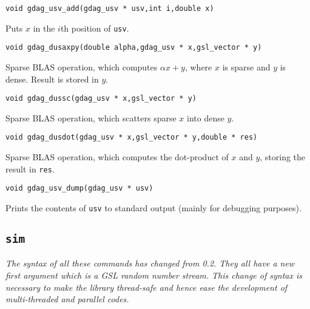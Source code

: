 \documentclass[12pt,a4paper]{article}
\newcommand{\gds}{\texttt{GDAGsim}}
\begin{document}
\begin{verbatim}
void gdag_usv_add(gdag_usv * usv,int i,double x)
\end{verbatim}
Puts $x$ in the $i$th position of \verb$usv$.

\begin{verbatim}
void gdag_dusaxpy(double alpha,gdag_usv * x,gsl_vector * y)
\end{verbatim}
Sparse BLAS operation, which computes $\alpha x + y$, where $x$ is
sparse and $y$ is dense. Result is stored in $y$.


\begin{verbatim}
void gdag_dussc(gdag_usv * x,gsl_vector * y)
\end{verbatim}
Sparse BLAS operation, which scatters sparse $x$ into dense $y$.

\begin{verbatim}
void gdag_dusdot(gdag_usv * x,gsl_vector * y,double * res)
\end{verbatim}
Sparse BLAS operation, which computes the dot-product of $x$ and $y$,
storing the result in \verb$res$.

\begin{verbatim}
void gdag_usv_dump(gdag_usv * usv)
\end{verbatim}
Prints the contents of \verb$usv$ to standard output (mainly for
debugging purposes).


\subsection{\texttt{sim}} 


\emph{The syntax of all these commands has changed from 0.2. They all
have a new first argument which is a GSL random number stream. This
change of syntax is necessary to make the library thread-safe and
hence ease the development of multi-threaded and parallel codes.}
\end{document}
